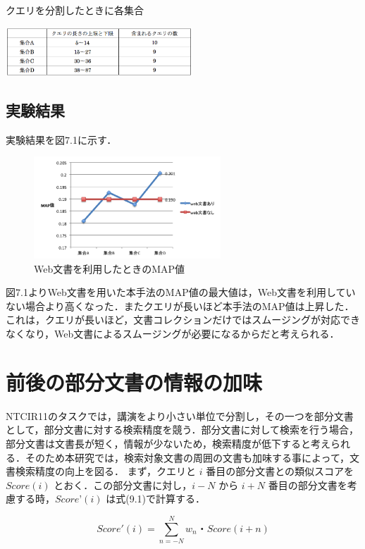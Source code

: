 \begin{table}
    \centering
    \caption{クエリを分割したときに各集合}
    \includegraphics[width=7cm]{./image/query_set.png}
    \label{query_set}
\end{table}

\subsection{実験結果}
実験結果を図7.1に示す．

\begin{figure}
    \centering
    \includegraphics[width=7cm]{./image/web_result.png}
    \caption{Web文書を利用したときのMAP値}
    \label{web_result1}
\end{figure}

図7.1よりWeb文書を用いた本手法のMAP値の最大値は，Web文書を利用していない場合より高くなった．またクエリが長いほど本手法のMAP値は上昇した．これは，クエリが長いほど，文書コレクションだけではスムージングが対応できなくなり，Web文書によるスムージングが必要になるからだと考えられる．


\section{前後の部分文書の情報の加味}
NTCIR11のタスクでは，講演をより小さい単位で分割し，その一つを部分文書として，部分文書に対する検索精度を競う．部分文書に対して検索を行う場合，部分文書は文書長が短く，情報が少ないため，検索精度が低下すると考えられる．そのため本研究では，検索対象文書の周囲の文書も加味する事によって，文書検索精度の向上を図る．
まず，クエリと $i$ 番目の部分文書との類似スコアを $Score(i)$ とおく．この部分文書に対し，$i-N$ から $i+N$ 番目の部分文書を考慮する時，$ Score’(i)$ は式(9.1)で計算する．

\begin{equation}
    Score'(i) = \sum_{n=-N}^N w_n・Score(i + n) 
    \label{zengo1}
\end{equation}

